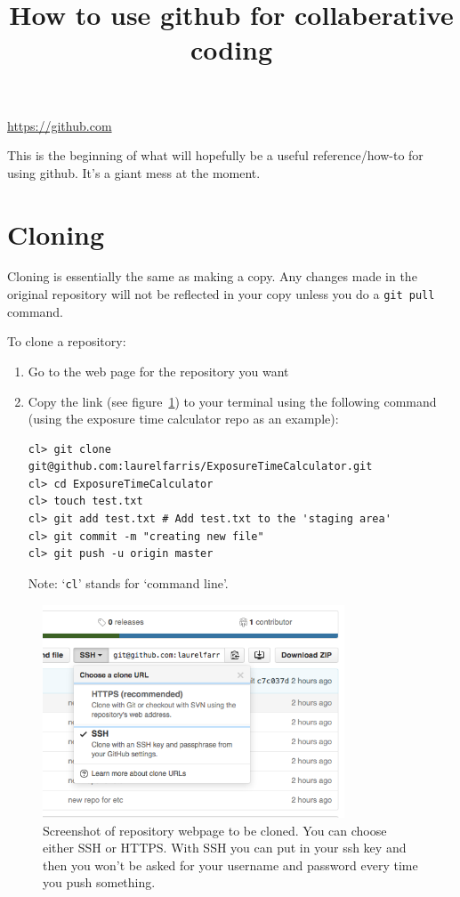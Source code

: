 \documentclass{article}
\title{How to use github for collaberative coding}
\date{}
\begin{document}
\maketitle

\url{https://github.com}

This is the beginning of what will hopefully be a useful reference/how-to
for using github. It's a giant mess at the moment.

\section{Cloning}
Cloning is essentially the same as making a copy. Any changes made
in the original repository will not be reflected in your copy unless
you do a \texttt{git pull} command.

To clone a repository:
\begin{enumerate}
    \item Go to the web page for the repository you want
    \item Copy the link (see figure~\ref{gitlink})
        to your terminal using the following command
        (using the exposure time calculator repo as an example):
\begin{verbatim}
cl> git clone git@github.com:laurelfarris/ExposureTimeCalculator.git
cl> cd ExposureTimeCalculator
cl> touch test.txt
cl> git add test.txt # Add test.txt to the 'staging area'
cl> git commit -m "creating new file"
cl> git push -u origin master
\end{verbatim}
        Note: `\texttt{cl}' stands for `command line'.
\end{enumerate}
\begin{figure}
\includegraphics[width=0.8\textwidth]{gitlink.png}
\caption{Screenshot of repository webpage to be cloned. You can choose
    either SSH or HTTPS\@. With SSH you can put in your ssh key and then
    you won't be asked for your username and password every time you push
    something.}
\label{gitlink}
\end{figure}
\end{document}
